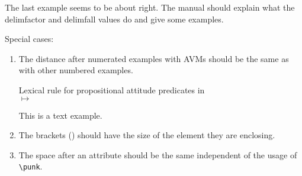 \documentclass[output=book
		,modfonts
		,nonflat
	        ,collection
	        ,collectionchapter
	        ,collectiontoclongg
 	        ,biblatex  
                ,babelshorthands
                ,newtxmath
                ,colorlinks, citecolor=brown 
                ,draftmode
		  ]{langscibook}
\begin{document}
The last example seems to be about right. The manual should explain what the delimfactor and
delimfall values do and give some examples.


Special cases:


\begin{enumerate}
\item %
The distance after numerated examples with AVMs should be the same as with other numbered examples.

\begin{exe}\ex\label{x:rc-79}  Lexical rule for propositional attitude predicates in \\
$\mapsto$\\
\flushright
{}
\end{exe}%
\lipsum[1][1-4]
\ea
This is a text example.
\z
\lipsum[1][1-4]


\item 
\label{brackets-too-large}
The brackets () should have the size of the element they are enclosing. 
\ea
{}
\z

\ea 
{}\label{coordparam2}
\z

\eal
\ex
{}

\ex
{}\label{omni}
\ex
{}
\zl



\item 

The space after an attribute should be the same independent of the usage of \verb+\punk+.
\ea
{}
\z


\end{enumerate}
\end{document}
